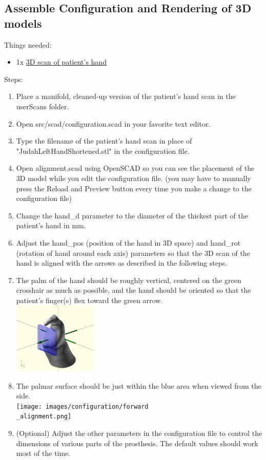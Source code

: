 \documentclass[11pt]{article}
\begin{document}
\subsection{Assemble Configuration and Rendering of 3D models}
Things needed:
\begin{itemize}
\item 1x \hyperlink{thing_hand\_scan}{3D scan of patient's hand}
\end{itemize}
Steps:
\begin{enumerate}
\item Place a manifold, cleaned-up version of the patient's hand scan in the userScans folder.
\item Open src/scad/configuration.scad in your favorite text editor.
\item Type the filename of the patient's hand scan in place of "JudahLeftHandShortened.stl" in the configuration file.
\item Open alignment.scad using OpenSCAD so you can see the placement of the 3D model while you edit the configuration file. (you may have to manually press the Reload and Preview button every time you make a change to the configuration file)
\item Change the hand\_d parameter to the diameter of the thickest part of the patient's hand in mm.
\item Adjust the hand\_pos (position of the hand in 3D space) and hand\_rot (rotation of hand around each axis) parameters so that the 3D scan of the hand is aligned with the arrows as described in the following steps.
\item The palm of the hand should be roughly vertical, centered on the green crosshair as much as possible, and the hand should be oriented so that the patient's finger(s) flex toward the green arrow.\\ \includegraphics[width=4cm]{images/configuration/positioning.png}
\item The palmar surface should be just within the blue area when viewed from the side.\\ \texttt{[image: images/configuration/forward\\\_alignment.png]}
\item (Optional) Adjust the other parameters in the configuration file to control the dimensions of various parts of the prosthesis. The default values should work most of the time.

\end{enumerate}
\end{document}
